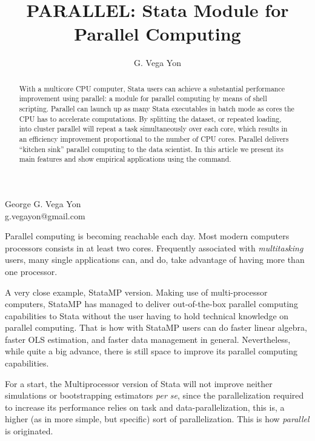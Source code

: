 \documentclass[bib]{statapress}
\begin{document}
\author{G. Vega Yon}{%
  George G. Vega Yon\\ g.vegayon@gmail.com
}
\title[parallel]{PARALLEL: Stata Module for Parallel Computing}

\maketitle

\begin{abstract}
With a multicore CPU computer, Stata users can achieve a substantial performance improvement using parallel: a module for parallel computing by means of shell scripting. Parallel can launch up as many Stata executables in batch mode as cores the CPU has to accelerate computations. By splitting the dataset, or repeated loading, into cluster parallel will repeat a task simultaneously over each core, which results in an efficiency improvement proportional to the number of CPU cores. Parallel delivers ``kitchen sink'' parallel computing to the data scientist. In this article we present its main features and show empirical applications using the command.

\end{abstract}

Parallel computing is becoming reachable each day. Most modern computers processors consists in at least two cores. Frequently associated with \textit{multitasking} users, many single applications can, and do, take advantage of having more than one processor.

A very close example, StataMP version. Making use of multi-processor computers, StataMP has managed to deliver out-of-the-box parallel computing capabilities to Stata without the user having to hold technical knowledge on parallel computing. That is how with StataMP users can do faster linear algebra, faster OLS estimation, and faster data management in general. Nevertheless, while quite a big advance, there is still space to improve its parallel computing capabilities.

For a start, the Multiprocessor version of Stata will not improve neither simulations or bootstrapping estimators \textit{per se}, since the parallelization required to increase its performance relies on task and data-parallelization, this is, a higher (as in more simple, but specific) sort of parallelization. This is how \textit{parallel} is originated.
\end{document}
